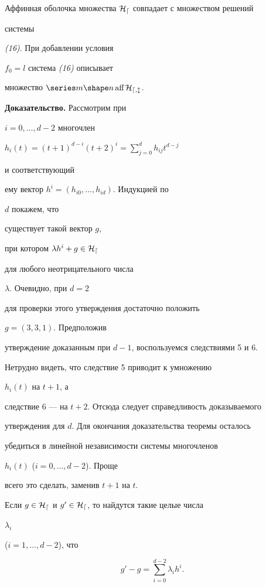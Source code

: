\begin{thm}


Аффинная оболочка множества $\cal H_d$ совпадает с множеством решений


системы


{\em (16)}. При добавлении условия


$f_0=l$ система {\em (16)} описывает


множество $\aff\cal H_{d,l}$.


\end{thm}





{\bf Доказательство.} Рассмотрим при


$i=0,\dotsc,d-2$ многочлен


$h_i(t)=(t+1)^{d-i}(t+2)^i=\sum\limits^d_{j=0}h_{ij}t^{d-j}$


и соответствующий


ему вектор $h^i=(h_{i0},\dotsc,h_{id})$. Индукцией по


$d$ покажем, что


существует такой вектор $g$,


при котором $\lambda h^i+g\in\cal H_d$


для любого неотрицательного числа


$\lambda$. Очевидно, при $d=2$


для проверки этого утверждения достаточно положить


$g=(3,3,1)$. Предположив


утверждение доказанным при $d-1$, воспользуемся следствиями 5 и 6.


Нетрудно видеть, что следствие 5 приводит к умножению


$h_i(t)$ на $t+1$, а


следствие 6 --- на $t+2$. Отсюда следует справедливость доказываемого


утверждения для $d$. Для окончания доказательства теоремы осталось


убедиться в линейной независимости системы многочленов


$h_i(t)$ ($i=0,\dotsc,d-2$). Проще


всего это сделать, заменив $t+1$ на $t$.





\begin{cor}


Если $g\in\cal H_d$ и $g'\in\cal H_d$, то найдутся такие целые числа


$\lambda_i$


($i=1,\dotsc,d-2$), что


$$


g'-g=\sum^{d-2}_{i=0}\lambda_i h^i.


$$


\end{cor}





